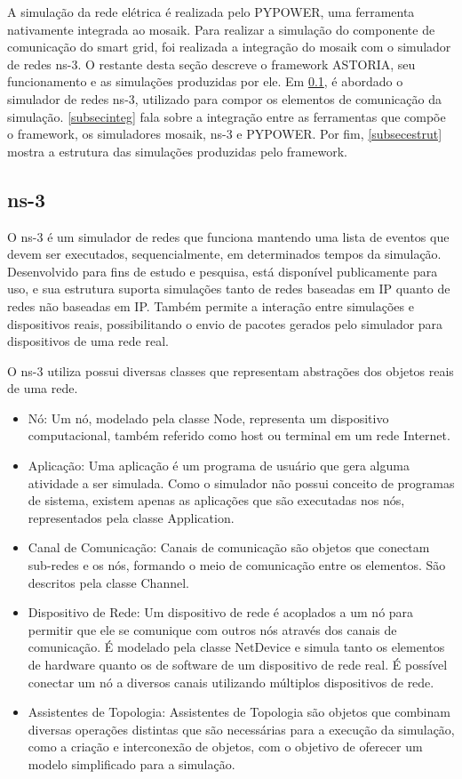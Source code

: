 \documentclass[cic,tc]{iiufrgs}
\begin{document}
A simulação da rede elétrica é realizada pelo PYPOWER, uma ferramenta nativamente integrada ao mosaik. Para realizar a simulação do componente de comunicação do smart grid, foi realizada a integração do mosaik com o simulador de redes ns-3.
O restante desta seção descreve o framework ASTORIA, seu funcionamento e as simulações produzidas por ele. Em \ref{subsecns3}, é abordado o simulador de redes ns-3, utilizado para compor os elementos de comunicação da simulação. \ref{subsecinteg} fala sobre a integração entre as ferramentas que compõe o framework, os simuladores mosaik, ns-3 e PYPOWER. Por fim, \ref{subsecestrut} mostra a estrutura das simulações produzidas pelo framework.
 
\subsection{ns-3}
\label{subsecns3}
 
O ns-3 \cite{nsnam} é um simulador de redes que funciona mantendo uma lista de eventos que devem ser executados, sequencialmente, em determinados tempos da simulação.  Desenvolvido para fins de estudo e pesquisa, está disponível publicamente para uso, e sua estrutura suporta simulações tanto de redes baseadas em IP quanto de redes não baseadas em IP. Também permite a interação entre simulações e dispositivos reais, possibilitando o envio de pacotes gerados pelo simulador para dispositivos de uma rede real.
 
O ns-3 utiliza possui diversas classes que representam abstrações dos objetos reais de uma rede.
 
\begin{itemize}
\item{Nó}: Um nó, modelado pela classe Node, representa um dispositivo computacional, também referido como host ou terminal em um rede Internet.
\item{Aplicação}: Uma aplicação é um programa de usuário que gera alguma atividade a ser simulada. Como o simulador não possui conceito de programas de sistema, existem apenas as aplicações que são executadas nos nós, representados pela classe Application.
\item{Canal de Comunicação}: Canais de comunicação são objetos que conectam sub-redes e os nós, formando o meio de comunicação entre os elementos. São descritos pela classe Channel.
\item{Dispositivo de Rede}: Um dispositivo de rede é acoplados a um nó para permitir que ele se comunique com outros nós através dos canais de comunicação. É modelado pela classe NetDevice e simula tanto os elementos de hardware quanto os de software de um dispositivo de rede real. É possível conectar um nó a diversos canais utilizando múltiplos dispositivos de rede.
\item{Assistentes de Topologia}: Assistentes de Topologia são objetos que combinam diversas operações distintas que são necessárias para a execução da simulação, como a criação e interconexão de objetos, com o objetivo de oferecer um modelo simplificado para a simulação.
\end{itemize}
 
\end{document}
